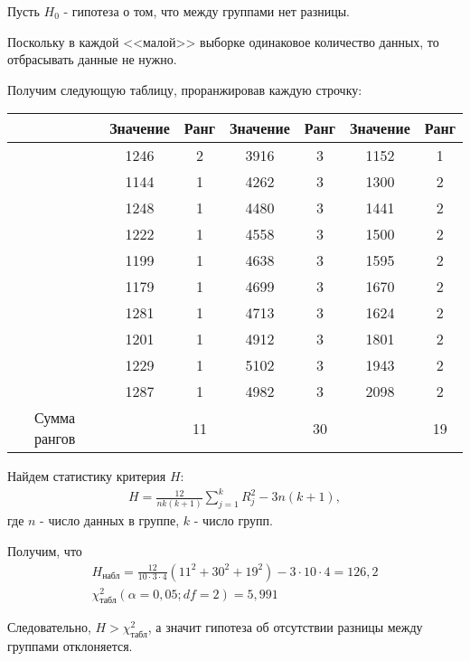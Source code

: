 \documentclass[utf8, a4paper, 14pt, russian, oneside]{book}
\begin{document}
\newpage
{}

Пусть $H_0$ - гипотеза о том, что между группами нет разницы.

Поскольку в каждой <<малой>> выборке одинаковое количество данных, то отбрасывать данные не нужно.

Получим следующую таблицу, проранжировав каждую строчку:
\begin{table}[h!]
    \centering 
    \begin{tabular}{|c|c|c|c|c|c|c|}
        \hline
        & Значение & Ранг & Значение & Ранг & Значение & Ранг \\ \hline
        & 1246 & 2 & 3916 & 3 & 1152 & 1 \\ \hline 
        & 1144 & 1 & 4262 & 3 & 1300 & 2 \\ \hline 
        & 1248 & 1 & 4480 & 3 & 1441 & 2 \\ \hline 
        & 1222 & 1 & 4558 & 3 & 1500 & 2 \\ \hline 
        & 1199 & 1 & 4638 & 3 & 1595 & 2 \\ \hline 
        & 1179 & 1 & 4699 & 3 & 1670 & 2 \\ \hline 
        & 1281 & 1 & 4713 & 3 & 1624 & 2 \\ \hline 
        & 1201 & 1 & 4912 & 3 & 1801 & 2 \\ \hline 
        & 1229 & 1 & 5102 & 3 & 1943 & 2 \\ \hline 
        & 1287 & 1 & 4982 & 3 & 2098 & 2 \\ \hline 
        Сумма рангов & & 11 & & 30 & & 19 \\ \hline
    \end{tabular}
\end{table}

Найдем статистику критерия $H$:
\begin{align*}
    H = \frac{12}{nk(k+1)} \sum_{j=1}^k R^2_j - 3n(k+1),
\end{align*}
где $n$ - число данных в группе, $k$ - число групп.

Получим, что
\begin{gather*}
    H_{\text{набл}}  = \frac{12}{10 \cdot 3 \cdot 4}\left(11^2 + 30^2 + 19^2\right) - 3 \cdot 10 \cdot 4 = 126,2 \\
    \chi^2_{\text{табл}}(\alpha = 0,05; df = 2) = 5,991
\end{gather*}

Следовательно, $H > \chi^2_{\text{табл}}$, а значит гипотеза об отсутствии разницы между группами отклоняется.
\newpage

\end{document}
